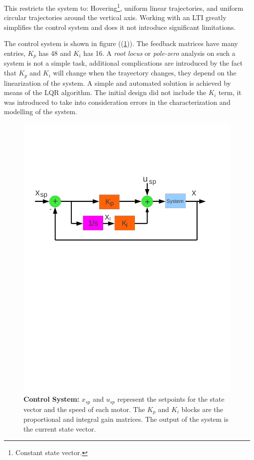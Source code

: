 \documentclass[conference]{IEEEtran}
\newcommand{\refp}[1]{(\ref{#1})}
\begin{document}
This restricts the system to: Hovering\footnote{Constant state vector.}, uniform linear trajectories, and uniform circular trajectories around the vertical axis. Working with an LTI greatly simplifies the control system and does it not introduce significant limitations.

The control system is shown in figure (\refp{fig:diagrama_bloques_eng.pdf}). The feedback matrices have many entries, $K_p$ has 48 and $K_i$ has 16. A \textit{root locus} or \textit{pole-zero} analysis on such a system is not a simple task, additional complications are introduced by the fact that $K_p$ and $K_i$ will change when the trayectory changes, they depend on the linearization of the system. A simple and automated solution is achieved by means of the LQR algorithm. The initial design did not include the $K_i$ term, it was introduced to take into consideration errors in the characterization and modelling of the system.

\begin{figure}
\vspace{-60pt}
	\centering
	\includegraphics[width=1\columnwidth]{./pics_paper/diagrama_bloques_eng.pdf}
\vspace{-180pt}
	\caption{\textbf{Control System:} $x_{sp}$ and $u_{sp}$ represent the setpoints for the state vector and the speed of each motor. The $K_p$ and $K_i$ blocks are the proportional and integral gain matrices. The output of the system is the current state vector.}
	\label{fig:diagrama_bloques_eng.pdf}
\end{figure}
\end{document}
